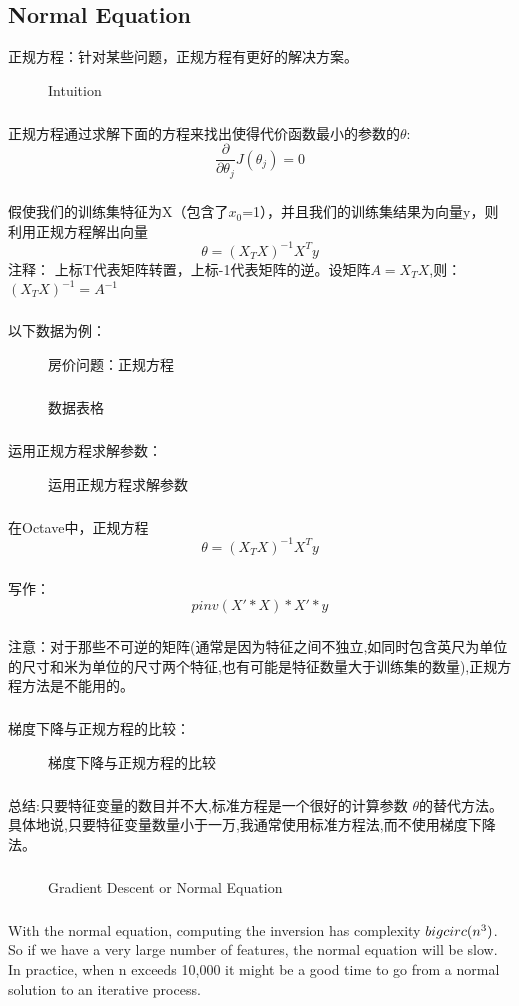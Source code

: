 \documentclass{article}
\begin{document}
\begin{CJK}{UTF8}{gbsn}
\subsection{Normal Equation}
正规方程：针对某些问题，正规方程有更好的解决方案。
\begin{figure}[H]
\caption{Intuition}
\label{fig:231}
\end{figure}
\subparagraph*{}
正规方程通过求解下面的方程来找出使得代价函数最小的参数的$\theta$:
\begin{equation}
\frac{\partial}{\partial\theta_j}J(\theta_j)=0
\end{equation}
\subparagraph*{}
假使我们的训练集特征为X（包含了$x_0$=1），并且我们的训练集结果为向量y，则利用正规方程解出向量
\begin{equation}
\theta=(X_TX)^{-1}X^Ty
\end{equation}
注释：
上标T代表矩阵转置，上标-1代表矩阵的逆。设矩阵$A=X_TX$,则：$(X_TX)^{-1}=A^{-1}$
\subparagraph*{}
以下数据为例：
\begin{figure}[H]
\caption{房价问题：正规方程}
\label{fig:232}
\end{figure}
\subparagraph*{}
\begin{figure}[H]
\caption{数据表格}
\label{fig:233}
\end{figure}
\subparagraph*{}
运用正规方程求解参数：
\begin{figure}[H]
\caption{运用正规方程求解参数}
\label{fig:234}
\end{figure}
\subparagraph*{}
在Octave中，正规方程\begin{equation}
\theta=(X_TX)^{-1}X^Ty
\end{equation}
\subparagraph*{}
写作：
\begin{equation}
pinv(X'*X)*X'*y
\end{equation}
\subparagraph*{}
注意：对于那些不可逆的矩阵(通常是因为特征之间不独立,如同时包含英尺为单位的尺寸和米为单位的尺寸两个特征,也有可能是特征数量大于训练集的数量),正规方程方法是不能用的。
\subparagraph*{}
梯度下降与正规方程的比较：
\begin{figure}[H]
\caption{梯度下降与正规方程的比较}
\label{fig:235}
\end{figure}
\subparagraph*{}
总结:只要特征变量的数目并不大,标准方程是一个很好的计算参数 $\theta$的替代方法。具体地说,只要特征变量数量小于一万,我通常使用标准方程法,而不使用梯度下降法。
\subparagraph*{}
\begin{figure}[H]
\caption{Gradient Descent or Normal Equation}
\label{fig:237}
\end{figure}
\subparagraph*{}
With the normal equation, computing the inversion has complexity $\\bigcirc(n^3)$. So if we have a very large number of features, the normal equation will be slow. In practice, when n exceeds 10,000 it might be a good time to go from a normal solution to an iterative process.

\end{CJK}
\end{document}
